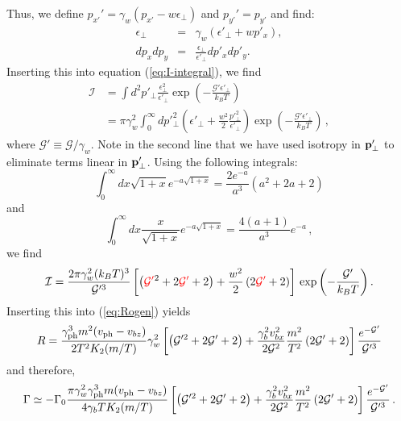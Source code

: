 \documentclass[usenatbib,iop,apj,numberedappendix]{aeb_emulateapj_2010}
\newcommand\qc[1]{{\color{red} \bf #1}}
\newcommand\bmath[1] {\mbox{\boldmath$\rm #1$}}
\def\bp{\bmath{p}}
\def\gph{\gamma_{\rm ph}}
\def\vph{v_{\rm ph}}
\def\cG{\mathcal{G}}
\newcommand{\kI}{\ensuremath{\mathcal{I}}}
\begin{document}
Thus, we define $p_{x'}'=\gamma_w(p_{x'}-w \epsilon_\perp)$ and $p_{y'}'=p_{y'}$ and find:
\begin{eqnarray}
\epsilon_\perp &=& \gamma_w(\epsilon'_\perp + w p'_x),\\
d p_x d p_y &=& \frac{\epsilon_\perp}{\epsilon'_\perp} d p'_x d p'_y.
\end{eqnarray}
Inserting this into equation (\ref{eq:I-integral}), we find
\begin{equation}
\begin{aligned}
\kI &= 
\int d^2\!p'_\perp \frac{\epsilon_\perp^2}{\epsilon'_\perp} \exp\left(-\frac{\cG'\epsilon'_\perp}{k_B T}\right)\\
&=
\pi \gamma_w^2 \int_0^\infty dp'^2_\perp \left(
  \epsilon'_\perp + \frac{w^2}{2} \frac{p'^2_\perp}{\epsilon'_\perp}
\right) \exp\left(-\frac{\cG'\epsilon'_\perp}{k_B T}\right)\,,
\end{aligned}
\end{equation}
where $\cG'\equiv\cG/\gamma_w$. Note in the second line that we have used isotropy in $\bp_{\perp}'$ to eliminate terms linear in $\bp_{\perp}'$. 
Using the following integrals: 
\begin{equation}
\int_0^\infty dx \sqrt{1+x} e^{-a\sqrt{1+x}} = \frac{2 e^{-a}}{a^3}\left(a^2 + 2a + 2\right)
\end{equation}
and 
\begin{equation}
\int_0^\infty dx \frac{x}{\sqrt{1+x}} e^{-a\sqrt{1+x}}
=
\frac{4(a+1)}{a^3} e^{-a}\,,
\end{equation}
we find
\begin{equation}
\kI
=
\frac{2 \pi \gamma_w^2 (k_B T)^3}{\cG'^3} \left[
\left(\qc{\cG'}^2+2\qc{\cG'}+2\right)
+
\frac{w^2}{2}
\left(2\qc{\cG'}+2\right)
\right]\,\exp\left(-\frac{\cG'}{k_B T}\right).
\end{equation}
Inserting this into (\ref{eq:Rogen}) yields
\begin{equation}
R
=
\frac{
  \gph^3 m^2 (\vph-v_{bz}) 
}{
  2 T^2 K_2(m/T)
}
\gamma_w^2
\left[
\left(\cG'^2 + 2\cG' + 2\right)
+
\frac{\gamma_b^2 v_{bx}^2}{2\cG^2} \frac{m^2}{T^2} \left(2 \cG' + 2\right)
\right] \frac{e^{-\cG'}}{\cG'^3}
\end{equation}
and therefore,
\begin{equation}
\Gamma \simeq - \Gamma_0
\frac{\pi \gamma_w^2 \gph^3 m (\vph-v_{bz})}{4 \gamma_b T K_2(m/T)}
\left[
\left( \cG'^2 + 2\cG' + 2 \right) 
+
\frac{\gamma_b^2 v_{bx}^2}{2\cG^2} \frac{m^2}{T^2} \left(2 \cG' + 2\right)
\right]
\frac{e^{-\cG'}}{\cG'^3}\,.
\label{eq:OGgen}
\end{equation}
\end{document}
